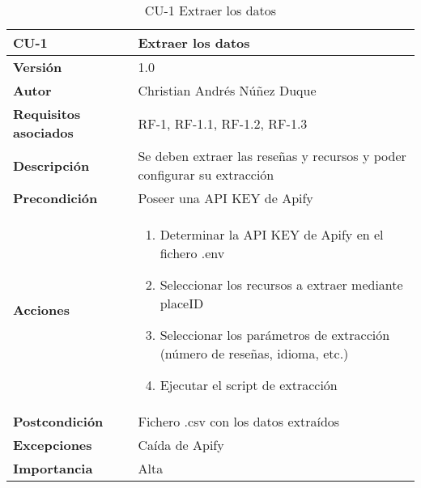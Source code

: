 
\begin{table}[p]
	\centering
	\begin{tabularx}{\linewidth}{ p{} p{} }
		\toprule
		\textbf{CU-1}    & \textbf{Extraer los datos}\\
		\toprule
		\textbf{Versión}              & 1.0    \\
		\textbf{Autor}                & Christian Andrés Núñez Duque \\
		\textbf{Requisitos asociados} & RF-1, RF-1.1, RF-1.2, RF-1.3 \\
		\textbf{Descripción}          & Se deben extraer las reseñas y recursos y poder configurar su extracción \\
		\textbf{Precondición}         & Poseer una API KEY de Apify \\
		\textbf{Acciones}             &
		\begin{enumerate}
			\def\labelenumi{\arabic{enumi}.}
			\tightlist
			\item Determinar la API KEY de Apify en el fichero .env
			\item Seleccionar los recursos a extraer mediante placeID
			\item Seleccionar los parámetros de extracción (número de reseñas, idioma, etc.)
			\item Ejecutar el script de extracción
		\end{enumerate}\\
		\textbf{Postcondición}        & Fichero .csv con los datos extraídos \\
		\textbf{Excepciones}          & Caída de Apify \\
		\textbf{Importancia}          & Alta \\
		\bottomrule
	\end{tabularx}
	\caption{CU-1 Extraer los datos}
\end{table}

